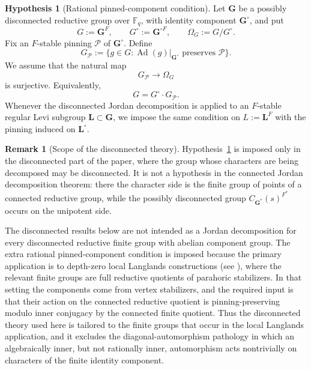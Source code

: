 \documentclass{amsart}
\theoremstyle{plain}
\numberwithin{equation}{section}
\theoremstyle{definition}
\newtheorem{hypothesis}[theorem]{Hypothesis}
\newtheorem{remark}[theorem]{Remark}
\newcommand{\Ad}{\operatorname{Ad}}
\newcommand{\cP}{\mathcal{P}}
\newcommand{\F}{\mathbb{F}}
\begin{document}
\begin{hypothesis}[Rational pinned-component condition]
\label{hyp:rational-pinned-component-condition}
Let $\mathbf G$ be a possibly disconnected reductive group over $\F_q$, with
identity component $\mathbf G^\circ$, and put
\[
        G:=\mathbf G^F,\qquad G^\circ:=\mathbf G^{\circ F},\qquad
        \Omega_G:=G/G^\circ.
\]
Fix an $F$-stable pinning $\cP$ of $\mathbf G^\circ$.  Define
\[
        G_{\cP}
        :=
        \{g\in G:\Ad(g)|_{\mathbf G^\circ}
        \text{ preserves }\cP\}.
\]
We assume that the natural map
\[
        G_{\cP}\longrightarrow \Omega_G
\]
is surjective.  Equivalently,
\[
        G=G^\circ\cdot G_{\cP}.
\]
Whenever the disconnected Jordan decomposition is applied to an $F$-stable
regular Levi subgroup $\mathbf L\subset \mathbf G$, we impose the same condition
on $L:=\mathbf L^F$ with the pinning induced on $\mathbf L^\circ$.
\end{hypothesis}

\begin{remark}[Scope of the disconnected theory]
\label{rmk:scope-rational-pinned-components}
Hypothesis~\ref{hyp:rational-pinned-component-condition} is imposed only in the
disconnected part of the paper, where the group whose characters are being
decomposed may be disconnected.  It is not a hypothesis in the connected Jordan
decomposition theorem: there the character side is the finite group of points of
a connected reductive group, while the possibly disconnected group
$C_{\mathbf G^*}(s)^{F^*}$ occurs on the unipotent side.

The disconnected results below are not intended as a Jordan decomposition for
every disconnected reductive finite group with abelian component group.  The
extra rational pinned-component condition is imposed because the primary
application is to depth-zero local Langlands constructions (see \cite{Mishra2026PinnedLLCDepthZero}), where the relevant
finite groups are full reductive quotients of parahoric stabilizers.  In that
setting the components come from vertex stabilizers, and the required input is
that their action on the connected reductive quotient is pinning-preserving
modulo inner conjugacy by the connected finite quotient.  Thus the disconnected
theory used here is tailored to the finite groups that occur in the local
Langlands application, and it excludes the diagonal-automorphism pathology in
which an algebraically inner, but not rationally inner, automorphism acts
nontrivially on characters of the finite identity component.
\end{remark}
\end{document}

